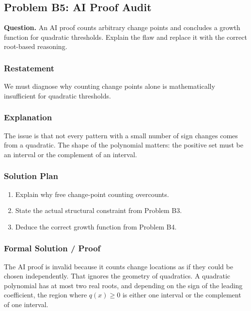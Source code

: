 \documentclass{article}
\begin{document}
\subsection{Problem B5: AI Proof Audit}

\textbf{Question.}
\newline
An AI proof counts arbitrary change points and concludes a growth function for
quadratic thresholds. Explain the flaw and replace it with the correct
root-based reasoning.

\begin{solutionbox}

\subsubsection{Restatement}

We must diagnose why counting change points alone is mathematically insufficient
for quadratic thresholds.

\subsubsection{Explanation}

The issue is that not every pattern with a small number of sign changes comes
from a quadratic. The shape of the polynomial matters: the positive set must be
an interval or the complement of an interval.

\subsubsection{Solution Plan}

\begin{enumerate}[leftmargin=2.5em]
    \item Explain why free change-point counting overcounts.
    \item State the actual structural constraint from Problem B3.
    \item Deduce the correct growth function from Problem B4.
\end{enumerate}

\subsubsection{Formal Solution / Proof}

The AI proof is invalid because it counts change locations as if they could be
chosen independently. That ignores the geometry of quadratics. A quadratic
polynomial has at most two real roots, and depending on the sign of the leading
coefficient, the region where \(q(x)\ge 0\) is either one interval or the
complement of one interval.


\end{solutionbox}
\end{document}
